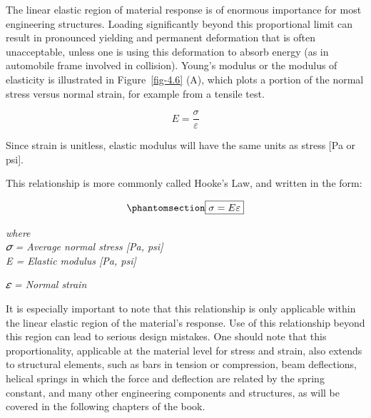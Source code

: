 \documentclass[
  letterpaper,
  DIV=11,
  numbers=noendperiod]{scrreprt}
\theoremstyle{definition}
\theoremstyle{remark}
\begin{document}
The linear elastic region of material response is of enormous importance
for most engineering structures. Loading significantly beyond this
proportional limit can result in pronounced yielding and permanent
deformation that is often unacceptable, unless one is using this
deformation to absorb energy (as in automobile frame involved in
collision). Young's modulus or the modulus of elasticity is illustrated
in Figure~\ref{fig-4.6} (A), which plots a portion of the normal stress
versus normal strain, for example from a tensile test.

\[
E=\frac{\sigma}{\varepsilon}
\]

Since strain is unitless, elastic modulus will have the same units as
stress {[}Pa or psi{]}.

This relationship is more commonly called Hooke's Law, and written in
the form:

\begin{equation}\phantomsection\label{eq-4.1}{
\boxed{\sigma=E \varepsilon}
}\end{equation}

\emph{where}\\
\emph{𝜎 = Average normal stress {[}Pa, psi{]}}\\
\emph{E = Elastic modulus {[}Pa, psi{]}}

\emph{𝜀 = Normal strain}

It is especially important to note that this relationship is only
applicable within the linear elastic region of the material's response.
Use of this relationship beyond this region can lead to serious design
mistakes. One should note that this proportionality, applicable at the
material level for stress and strain, also extends to structural
elements, such as bars in tension or compression, beam deflections,
helical springs in which the force and deflection are related by the
spring constant, and many other engineering components and structures,
as will be covered in the following chapters of the book.
\end{document}
